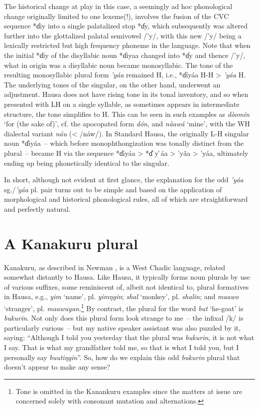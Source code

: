 \documentclass[output=paper,colorlinks,citecolor=brown]{langscibook}
\begin{document}
The historical change at play in this case, a seemingly ad hoc phonological change originally limited to one lexeme(!), involves the fusion of the CVC sequence *ɗiy into a single palatalized stop *ɗy, which subsequently was altered further into the glottalized palatal semivowel /’y/, with this new /’y/ being a lexically restricted but high frequency phoneme in the language. Note that when the initial *ɗiy of the disyllabic noun *ɗiyaa changed into *ɗy and thence /’y/, what in origin was a disyllabic noun became monosyllabic. The tone of the resulting monosyllabic plural form \textit{’yáa} remained H, i.e., *ɗíyáa H-H > \textit{’yáa} H. The underlying tones of the singular, on the other hand, underwent an adjustment. Hausa does not have rising tone in its tonal inventory, and so when presented with LH on a single syllable, as sometimes appears in intermediate structure, the tone simplifies to H. This can be seen in such examples as \textit{dòomín} `for (the sake of)’, cf. the apocopated form \textit{dón}, and \textit{nàawá} `mine’, with the WH dialectal variant \textit{náu} (< /náw/). In Standard Hausa, the originally L-H singular noun *ɗìyáa~-- which before monophthongization was tonally distinct from the plural~-- became H via the sequence *ɗìyáa > *ɗ ̀y ̀áa > ’yǎa  > ’yáa, ultimately ending up being phonetically identical to the singular. 

In short, although not evident at first glance, the explanation for the odd \textit{’yáa} sg./\textit{’yáa} pl. pair turns out to be simple and based on the application of morphological and historical phonological rules, all of which are straightforward and perfectly natural. 

\section{A Kanakuru plural}

Kanakuru, as described in Newman \citeyearpar{Newman1974}, is a West Chadic language, related somewhat distantly to Hausa. Like Hausa, it typically forms noun plurals by use of various suffixes, some reminiscent of, albeit not identical to, plural  formatives in Hausa, e.g., \textit{yim} `name’, pl. \textit{yimŋgin}; \textit{shal} `monkey’, pl. \textit{shalin}; and \textit{maawo} `stranger’, pl. \textit{maawuyan}.\footnote{Tone is omitted in the Kanankuru examples since the matters at issue are concerned solely with consonant mutation and alternations.} By contrast, the plural for the word \textit{but} `he-goat’ is \textit{bukurin}. Not only does this plural form look strange to me~-- the  infixal /k/ is particularly curious~-- but my native speaker assistant was also puzzled by it, saying: ``Although I told you yesterday that the plural was \textit{bukurin}, it is not what I say. That is what my grandfather told me, so that is what I told you, but I personally say \textit{buutiŋgin}”. So, how do we explain this odd \textit{bukurin} plural that doesn’t appear to make any sense? 
\end{document}
